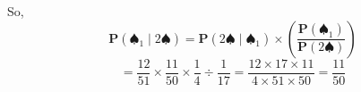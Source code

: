 So, \\ 
\begin{equation*} 
\mathbf{P}(\spadesuit_1 \mid 2 \spadesuit) = \mathbf{P}(2 \spadesuit \mid  \spadesuit_1) \times \left(\frac{\mathbf{P}(\spadesuit_1)}{\mathbf{P}(2 \spadesuit)}\right)
 \end{equation*} 
 \begin{equation*} 
= \frac{12}{51} \times \frac{11}{50} \times \frac{1}{4} \div \frac{1}{17} = \frac{12 \times 17 \times 11}{4 \times 51 \times 50} = \frac{11}{50}
 \end{equation*} 
 